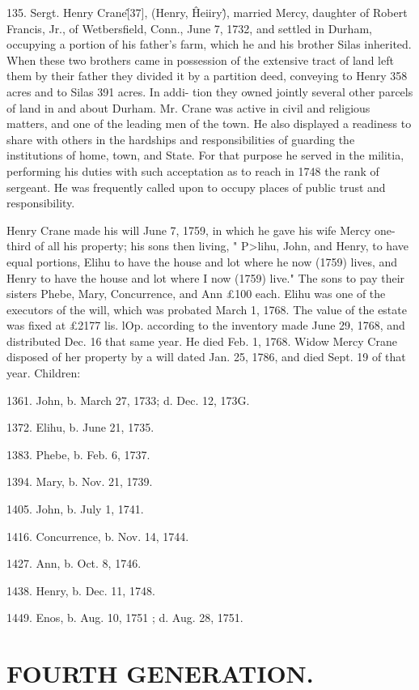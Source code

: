\documentclass{book}
\begin{document}
135. Sergt. Henry Crane\^ [37], (Henry, \^ Heiiry\^), married 
Mercy, daughter of Robert Francis, Jr., of Wetbersfield, Conn., 
June 7, 1732, and settled in Durham, occupying a portion of his 
father's farm, which he and his brother Silas inherited. When 
these two brothers came in possession of the extensive tract of 
land left them by their father they divided it by a partition deed, 
conveying to Henry 358 acres and to Silas 391 acres. In addi- 
tion they owned jointly several other parcels of land in and about 
Durham. Mr. Crane was active in civil and religious matters, 
and one of the leading men of the town. He also displayed a 
readiness to share with others in the hardships and responsibilities 
of guarding the institutions of home, town, and State. For that 
purpose he served in the militia, performing his duties with such 
acceptation as to reach in 1748 the rank of sergeant. He was 
frequently called upon to occupy places of public trust and 
responsibility. 

Henry Crane made his will June 7, 1759, in which he gave his 
wife Mercy one-third of all his property; his sons then living, 
" P>lihu, John, and Henry, to have equal portions, Elihu to have 
the house and lot where he now (1759) lives, and Henry to have 
the house and lot where I now (1759) live." The sons to pay 
their sisters Phebe, Mary, Concurrence, and Ann £100 each. 
Elihu was one of the executors of the will, which was probated 
March 1, 1768. The value of the estate was fixed at £2177  
lis.  lOp. according to the inventory made June 29, 1768, and 
distributed Dec. 16 that same year. He died Feb. 1, 1768. 
Widow Mercy Crane disposed of her property by a will dated 
Jan. 25, 1786, and died Sept. 19 of that year. Children: 

1361. John, b. March 27, 1733; d. Dec. 12, 173G. 

1372. Elihu, b. June 21, 1735. 

1383. Phebe, b. Feb. 6, 1737. 

1394. Mary, b. Nov. 21, 1739. 

1405. John, b. July 1, 1741. 

1416. Concurrence, b. Nov. 14, 1744. 

1427. Ann, b. Oct. 8, 1746. 

1438. Henry, b. Dec. 11, 1748. 

1449. Enos, b. Aug. 10, 1751 ; d. Aug. 28, 1751. 



\section{FOURTH GENERATION.}
\end{document}
